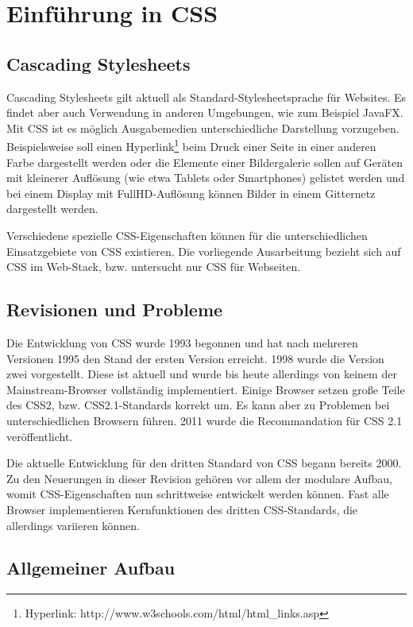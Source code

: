 \section{Einführung in CSS}
\subsection{Cascading Stylesheets}

Cascading Stylesheets gilt aktuell als Standard-Stylesheetsprache für Websites. Es findet aber auch Verwendung in anderen Umgebungen, wie zum Beispiel JavaFX. Mit CSS ist es möglich Ausgabemedien unterschiedliche Darstellung vorzugeben. Beispielsweise soll einen Hyperlink\footnote{Hyperlink: http://www.w3schools.com/html/html\_links.asp} beim Druck einer Seite in einer anderen Farbe dargestellt werden oder die Elemente einer Bildergalerie sollen auf Geräten mit kleinerer Auflösung (wie etwa Tablets oder Smartphones) gelistet werden und bei einem Display mit FullHD-Auflösung können Bilder in einem Gitternetz dargestellt werden. 

Verschiedene spezielle CSS-Eigenschaften können für die unterschiedlichen Einsatzgebiete von CSS existieren. Die vorliegende Ausarbeitung bezieht sich auf CSS im Web-Stack, bzw. untersucht nur CSS für Webseiten. 

\subsection{Revisionen und Probleme}
Die Entwicklung von CSS wurde 1993 begonnen und hat nach mehreren Versionen 1995 den Stand der ersten Version erreicht. 1998 wurde die Version zwei vorgestellt. Diese ist aktuell und wurde bis heute allerdings von keinem der Mainstream-Browser vollständig implementiert. Einige Browser setzen große Teile des CSS2, bzw. CSS2.1-Standards korrekt um. Es kann aber zu Problemen bei unterschiedlichen Browsern führen. 2011 wurde die Recommandation für CSS 2.1 veröffentlicht. 

Die aktuelle Entwicklung für den dritten Standard von CSS begann bereits 2000. Zu den Neuerungen in dieser Revision gehören vor allem der modulare Aufbau, womit CSS-Eigenschaften nun schrittweise entwickelt werden können. Fast alle Browser implementieren Kernfunktionen des dritten CSS-Standards, die allerdings variieren können. 

\subsection{Allgemeiner Aufbau}

